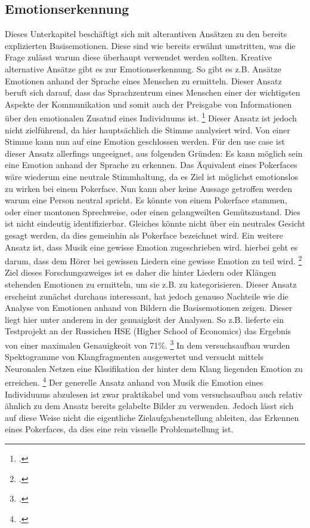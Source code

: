 \documentclass[12pt, a4paper]{scrbook}
\begin{document}
\subsection{Emotionserkennung}
Dieses Unterkapitel beschäftigt sich mit alterantiven Ansätzen zu den bereits explizierten Basisemotionen. Diese sind wie bereits erwähnt umstritten, was die Frage zulässt warum diese überhaupt
verwendet werden sollten. Kreative alternative Ansätze gibt es zur Emotionserkennung. So gibt es z.B. Ansätze Emotionen anhand der Sprache eines Menschen zu ermitteln.
Dieser Ansatz beruft sich darauf, dass das Sprachzentrum eines Menschen einer der wichtigsten Aspekte der Kommunikation und somit auch der Preisgabe von Informationen über den emotionalen Zusatnd eines Individuums ist.
\footcite[Vgl. ][Abstract]{EmotionInSpeech}
Dieser Ansatz ist jedoch nicht zielführend, da hier hauptsächlich die Stimme analysiert wird. Von einer Stimme kann nun auf eine Emotion geschlossen werden. Für den use case ist dieser Ansatz allerfings ungeeignet, aus folgenden Gründen:
\newline
Es kann möglich sein eine Emotion anhand der Sprache zu erkennen. Das Äquivalent eines Pokerfaces wäre wiederum eine neutrale Stimmhaltung, da es Ziel ist möglichst emotionslos zu wirken bei einem Pokerface. Nun kann aber keine Aussage getroffen werden warum eine Person neutral spricht. Es könnte von einem Pokerface stammen, oder einer montonen Sprechweise, oder einen gelangweilten Gemütszustand. Dies ist nicht eindeutig identifizierbar. Gleiches könnte nicht über ein neutrales Gesicht gesagt werden, da dies gemeinhin als Pokerface bezeichnet wird. 
Ein weitere Ansatz ist, dass Musik eine gewisse Emotion zugeschrieben wird. hierbei geht es darum, dass dem Hörer bei gewissen Liedern eine gewisse Emotion zu teil wird.
\footcite[Vgl.][1]{MusicEmotion}
 Ziel dieses Forschungszweiges ist es daher die hinter Liedern oder Klängen stehenden Emotionen zu ermitteln, um sie z.B. zu kategorisieren.
Dieser Ansatz erscheint zunächst durchaus interessant, hat jedoch genauso Nachteile wie die Analyse von Emotionen anhand von Bildern die Basisemotionen zeigen. Dieser liegt hier unter anderem in
der genuaigkeit der Analysen. So z.B. lieferte ein Testprojekt an der Russichen HSE (Higher School of Economics) das Ergebnis von einer maximalen Genauigkeoit von 71\%.
\footcite[Vgl. ][Abstract]{EmotionInSound}
In dem versuchsaufbau wurden Spektogramme von Klangfragmenten ausgewertet und versucht mittels Neuronalen Netzen eine Klssifikation der hinter dem Klang liegenden Emotion zu erreichen.
\footcite[Vgl. ][Abstract]{EmotionInSound}
Der generelle Ansatz anhand von Musik die Emotion eines Individuums abzulesen ist zwar praktikabel und vom versuchsaufbau auch relativ ähnlich zu dem Ansatz bereits gelabelte Bilder zu verwenden. Jedoch lässt sich auf diese Weise nicht die eigentliche Zielaufgabenstellung ableiten, das Erkennen eines Pokerfaces, da dies eine rein visuelle Problemstellung ist.
\let\cleardoublepage\relax
\newpage
\end{document}
